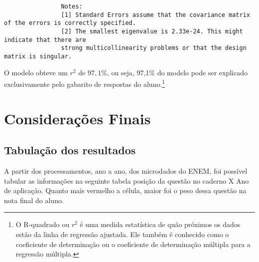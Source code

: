 \documentclass[
	article,			%
	11pt,				%
	oneside,			%
	a4paper,			%
	english,			%
	brazil,				%
	sumario=tradicional
]{abntex2}
\begin{document}
\begin{verbatim}
				Notes:
				[1] Standard Errors assume that the covariance matrix of the errors is correctly specified.
				[2] The smallest eigenvalue is 2.33e-24. This might indicate that there are
				strong multicollinearity problems or that the design matrix is singular.
			\end{verbatim} 

			O modelo obteve um $r^2$ de $97,1\%$, ou seja, 97,1\% do modelo pode ser explicado exclusivamente pelo gabarito de respostas do aluno.\footnote{O R-quadrado ou $r^2$ é uma medida estatística de quão próximos os dados estão da linha de regressão ajustada. Ele também é conhecido como o coeficiente de determinação ou o coeficiente de determinação múltipla para a regressão múltipla.}  
			
	\section{Considerações Finais}
	
		\subsection{Tabulação dos resultados}
		
		A partir dos processamentos, ano a ano, dos microdados do ENEM, foi possível tabular as informações na seguinte tabela posição da questão no caderno X Ano de aplicação. Quanto mais vermelho a célula, maior foi o peso dessa questão na nota final do aluno.
		
\end{document}
